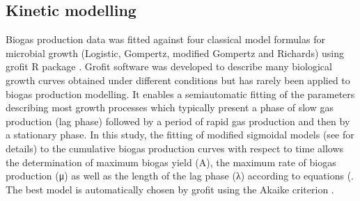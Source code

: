 \subsection{Kinetic modelling}
Biogas production data was fitted against four classical model formulas for microbial growth (Logistic, Gompertz, modified Gompertz and Richards) using grofit R package \cite{Kahm_2010}. Grofit software was developed to describe many biological growth curves obtained under different conditions but has rarely been applied to biogas production modelling. It enables a semiautomatic fitting of the parameters describing most growth processes which typically present a phase of slow gas production (lag phase) followed by a period of rapid gas production and then by a stationary phase. In this study, the fitting of modified sigmoidal models (see \cite{Zwietering1990} for details) to the cumulative biogas production curves  with respect to time allows the determination of maximum biogas yield (A), the maximum rate of biogas production (μ) as well as the length of the lag phase (λ) according to equations (. The best model is automatically chosen by grofit using the Akaike criterion \cite{Hasenbrink_2006}.